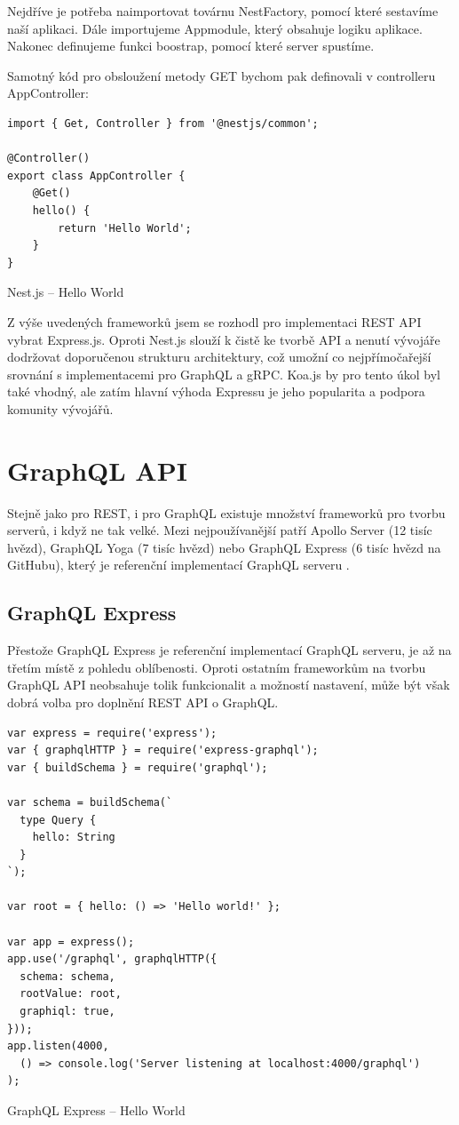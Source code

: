 \documentclass[thesis=M,czech]{FITthesis}[2019/12/23]
\begin{document}
Nejdříve je potřeba naimportovat továrnu NestFactory, pomocí které sestavíme naší aplikaci. Dále importujeme Appmodule, který obsahuje logiku aplikace. Nakonec definujeme funkci boostrap, pomocí které server spustíme.

Samotný kód pro obsloužení metody GET bychom pak definovali v controlleru AppController:

\begin{listing}[H]
\begin{verbatim}
import { Get, Controller } from '@nestjs/common';

@Controller()
export class AppController {
    @Get()
    hello() {
        return 'Hello World';
    }
}
\end{verbatim}
\caption{Nest.js -- Hello World}
\label{lst:nest_hello}
\end{listing}

Z výše uvedených frameworků jsem se rozhodl pro implementaci REST API vybrat Express.js. Oproti Nest.js slouží k čistě ke tvorbě API a nenutí vývojáře  dodržovat doporučenou strukturu architektury, což umožní co nejpřímočařejší srovnání s implementacemi pro GraphQL a gRPC. Koa.js by pro tento úkol byl také vhodný, ale zatím hlavní výhoda Expressu je jeho popularita a podpora komunity vývojářů.

\section{GraphQL API}
Stejně jako pro REST, i pro GraphQL existuje množství frameworků pro tvorbu serverů, i když ne tak velké. Mezi nejpoužívanější patří Apollo Server (12 tisíc hvězd), GraphQL Yoga (7 tisíc hvězd) nebo GraphQL Express (6 tisíc hvězd na GitHubu), který je referenční implementací GraphQL serveru \cite{graphql_libraries}.

\subsection{GraphQL Express}
Přestože GraphQL Express \cite{express-graphql} je referenční implementací GraphQL serveru, je až na třetím místě z pohledu oblíbenosti. Oproti ostatním frameworkům na tvorbu GraphQL API neobsahuje tolik funkcionalit a možností nastavení, může být však dobrá volba pro doplnění REST API o GraphQL.

\begin{listing}[H]
\begin{verbatim}
var express = require('express');
var { graphqlHTTP } = require('express-graphql');
var { buildSchema } = require('graphql');

var schema = buildSchema(`
  type Query {
    hello: String
  }
`);

var root = { hello: () => 'Hello world!' };

var app = express();
app.use('/graphql', graphqlHTTP({
  schema: schema,
  rootValue: root,
  graphiql: true,
}));
app.listen(4000, 
  () => console.log('Server listening at localhost:4000/graphql')
);
\end{verbatim}
\caption{GraphQL Express -- Hello World}
\label{lst:graphqljs_hello}
\end{listing}
\end{document}
